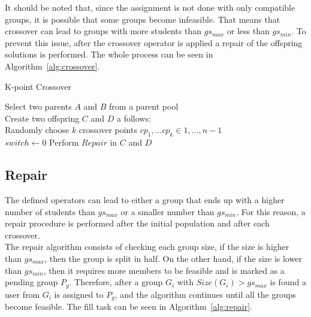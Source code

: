 It should be noted that, since the assignment is not done with only compatible groups, it is possible that some groups become infeasible. That means that crossover can lead to groups with more students than $gs_{max}$ or less than $gs_{min}$. To prevent this issue, after the crossover operator is applied a repair of the offspring solutions is performed. The whole process can be seen in Algorithm~\ref{alg:crossover}.\\

\begin{algorithm}[H]
    \caption{K-point Crossover}
    \label{alg:crossover}
    \SetAlgoLined 
Select two parents $A$ and $B$ from a parent pool\;\\
Create two offspring $C$ and $D$ a follows:\;\\
Randomly choose $k$ crossover points $cp_1,...cp_k \in {1,...,n-1}$\;\\
$switch \gets 0$
Perform $Repair$ in $C$ and $D$
\end{algorithm}

\subsection{Repair} \label{sec:Repair}

The defined operators can lead to either a group that ends up with a higher number of students than $gs_{max}$ or a smaller number than $gs_{min}$. For this reason, a repair procedure is performed after the initial population and after each crossover.\\

The repair algorithm consists of checking each group size, if the size is higher than $gs_{max}$, then the group is split in half. On the other hand, if the size is lower than $gs_{min}$, then it requires more members to be feasible and is marked as a pending group $P_g$.  Therefore, after a group $G_i$ with $Size(G_i) > gs_{max}$ is found a user from $G_i$ is assigned to $P_g$, and the algorithm continues until all the groups become feasible.
The fill task can be seen in Algorithm~\ref{alg:repair}.\\

